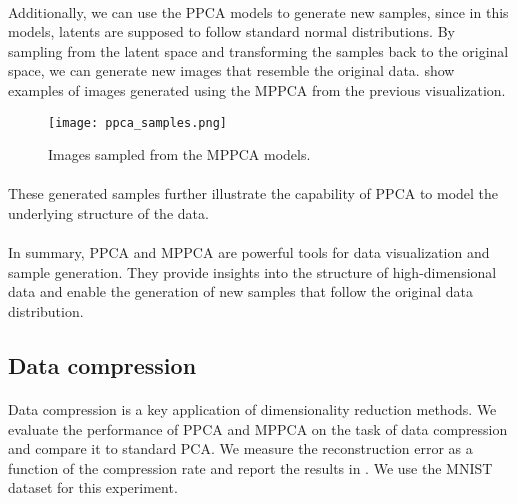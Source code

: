 \documentclass{article}
\begin{document}
\paragraph{} Additionally, we can use the PPCA models to generate new samples, since in this models, latents are supposed to follow standard normal distributions. By sampling from the latent space and transforming the samples back to the original space, we can generate new images that resemble the original data.  show examples of images generated using the MPPCA from the previous visualization.

\begin{figure}[H]
    \centering
    \texttt{[image: ppca\_samples.png]}
    \caption{Images sampled from the MPPCA models.}
    \label{fig:ppca_samples}
\end{figure}

\paragraph{} These generated samples further illustrate the capability of PPCA to model the underlying structure of the data.

\paragraph{} In summary, PPCA and MPPCA are powerful tools for data visualization and sample generation. They provide insights into the structure of high-dimensional data and enable the generation of new samples that follow the original data distribution.

\subsection{Data compression}



\paragraph{} Data compression is a key application of dimensionality reduction methods. We evaluate the performance of PPCA and MPPCA on the task of data compression and compare it to standard PCA. We measure the reconstruction error as a function of the compression rate and report the results in . We use the MNIST dataset for this experiment.
\end{document}
